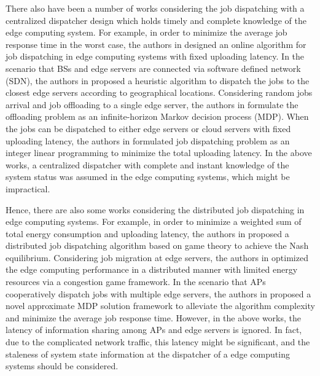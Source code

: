 There also have been a number of works considering the job dispatching with a centralized dispatcher design which holds timely and complete knowledge of the edge computing system.
For example, in order to minimize the average job response time in the worst case, the authors in \cite{tan-online} designed an online algorithm for job dispatching in edge computing systems with fixed uploading latency.
In the scenario that BSs and edge servers are connected via software defined network (SDN), the authors in \cite{IOTJ18-FanQ} proposed a heuristic algorithm to dispatch the jobs to the closest edge servers according to geographical locations.
Considering random jobs arrival and job offloading to a single edge server, the authors in \cite{mdp-globecom,mdp-tvt} formulate the offloading problem as an infinite-horizon Markov decision process (MDP).
When the jobs can be dispatched to either edge servers or cloud servers with fixed uploading latency, the authors in \cite{MASS18-MengZ} formulated job dispatching problem as an integer linear programming to minimize the total uploading latency.
In the above works, a centralized dispatcher with complete and instant knowledge of the system status was assumed in the edge computing systems, which might be impractical.

Hence, there are also some works considering the distributed job dispatching in edge computing systems.
For example, in order to minimize a weighted sum of total energy consumption and uploading latency, the authors in \cite{ToN-Xuchen2016} proposed a distributed job dispatching algorithm based on game theory to achieve the Nash equilibrium. 
Considering job migration at edge servers, the authors in \cite{ToN-xujie2018} optimized the edge computing performance in a distributed manner with limited energy resources via a congestion game framework.
In the scenario that APs cooperatively dispatch jobs with multiple edge servers, the authors in \cite{mdp-jcin} proposed a novel approximate MDP solution framework to alleviate the algorithm complexity and minimize the average job response time.
However, in the above works, the latency of information sharing among APs and edge servers is ignored.
In fact, due to the complicated network traffic, this latency might be significant, and the staleness of system state information at the dispatcher of a edge computing systems should be considered.

